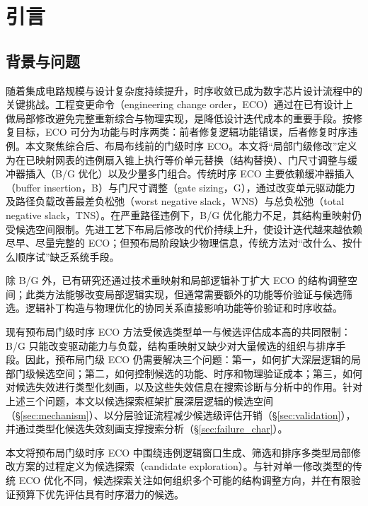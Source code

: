 \documentclass[twocolumn,10pt,fontset=windows]{ctexart}
\begin{document}
\section{引言}

\subsection{背景与问题}
随着集成电路规模与设计复杂度持续提升，时序收敛已成为数字芯片设计流程中的关键挑战。工程变更命令（engineering change order，ECO）通过在已有设计上做局部修改避免完整重新综合与物理实现，是降低设计迭代成本的重要手段。按修复目标，ECO 可分为功能与时序两类：前者修复逻辑功能错误，后者修复时序违例。本文聚焦综合后、布局布线前的门级时序 ECO。本文将“局部门级修改”定义为在已映射网表的违例扇入锥上执行等价单元替换（结构替换）、门尺寸调整与缓冲器插入（B/G 优化）以及少量多门组合。传统时序 ECO 主要依赖缓冲器插入（buffer insertion，B）与门尺寸调整（gate sizing，G），通过改变单元驱动能力及路径负载改善最差负松弛（worst negative slack，WNS）与总负松弛（total negative slack，TNS）。在严重路径违例下，B/G 优化能力不足，其结构重映射仍受候选空间限制\cite{ho2010eco,liu2021rlsizer,chen2024aito}。先进工艺下布局后修改的代价持续上升，使设计迭代越来越依赖尽早、尽量完整的 ECO；但预布局阶段缺少物理信息，传统方法对“改什么、按什么顺序试”缺乏系统手段。

除 B/G 外，已有研究还通过技术重映射和局部逻辑补丁扩大 ECO 的结构调整空间；此类方法能够改变局部逻辑实现，但通常需要额外的功能等价验证与候选筛选。逻辑补丁构造与物理优化的协同关系直接影响功能等价验证和时序收益。

现有预布局门级时序 ECO 方法受候选类型单一与候选评估成本高的共同限制：B/G 只能改变驱动能力与负载，结构重映射又缺少对大量候选的组织与排序手段。因此，预布局门级 ECO 仍需要解决三个问题：第一，如何扩大深层逻辑的局部门级候选空间；第二，如何控制候选的功能、时序和物理验证成本；第三，如何对候选失效进行类型化刻画，以及这些失效信息在搜索诊断与分析中的作用。针对上述三个问题，本文以候选探索框架扩展深层逻辑的候选空间（\S\ref{sec:mechanism}）、以分层验证流程减少候选级评估开销（\S\ref{sec:validation}），并通过类型化候选失效刻画支撑搜索分析（\S\ref{sec:failure_char}）。

本文将预布局门级时序 ECO 中围绕违例逻辑窗口生成、筛选和排序多类型局部修改方案的过程定义为候选探索（candidate exploration）。与针对单一修改类型的传统 ECO 优化不同，候选探索关注如何组织多个可能的结构调整方向，并在有限验证预算下优先评估具有时序潜力的候选。
\end{document}
